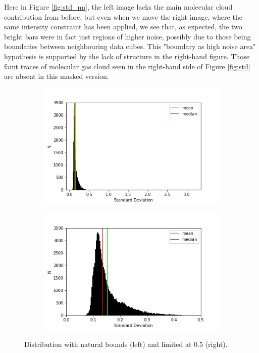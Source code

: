 \documentclass{article}
\begin{document}
Here in Figure \ref{fig:std_nn}, the left image lacks the main molecular cloud contribution from before, but even when we move the right image, where the same intensity constraint has been applied, we see that, as expected, the two bright bars were in fact just regions of higher noise, possibly due to those being boundaries between neighbouring data cubes. This "boundary as high noise area" hypothesis is supported by the lack of structure in the right-hand figure. Those faint traces of molecular gas cloud seen in the right-hand side of Figure \ref{fig:std} are absent in this masked version.

\pagebreak

\begin{figure}[h]
    \centering
    \captionsetup{justification=centering}
    \begin{subfigure}[H]{0.4\linewidth}
        \includegraphics[width=\linewidth]{Photos/std_hist.png}
    \end{subfigure}
    \begin{subfigure}[H]{0.4\linewidth}
        \includegraphics[width=\linewidth]{Photos/std_hist_lim.png}
    \end{subfigure}
    \captionsetup{justification=centering,margin=1cm}
    \caption{Distribution with natural bounds (left) and limited at 0.5 (right).}
    \label{fig:std_hist}
\end{figure}
\end{document}
